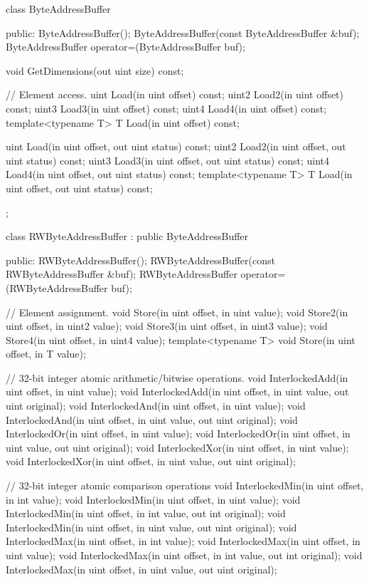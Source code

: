 \begin{HLSL}
 class ByteAddressBuffer {
 public:
   ByteAddressBuffer();
   ByteAddressBuffer(const ByteAddressBuffer &buf);
   ByteAddressBuffer operator=(ByteAddressBuffer buf);

   void GetDimensions(out uint size) const;

   // Element access.
   uint Load(in uint offset) const;
   uint2 Load2(in uint offset) const;
   uint3 Load3(in uint offset) const;
   uint4 Load4(in uint offset) const;
   template<typename T>
   T Load(in uint offset) const;

   uint Load(in uint offset, out uint status) const;
   uint2 Load2(in uint offset, out uint status) const;
   uint3 Load3(in uint offset, out uint status) const;
   uint4 Load4(in uint offset, out uint status) const;
   template<typename T>
   T Load(in uint offset, out uint status) const;
};

 class RWByteAddressBuffer : public ByteAddressBuffer {
 public:
   RWByteAddressBuffer();
   RWByteAddressBuffer(const RWByteAddressBuffer &buf);
   RWByteAddressBuffer operator=(RWByteAddressBuffer buf);

   // Element assignment.
   void Store(in uint offset, in uint value);
   void Store2(in uint offset, in uint2 value);
   void Store3(in uint offset, in uint3 value);
   void Store4(in uint offset, in uint4 value);
   template<typename T>
   void Store(in uint offset, in T value);

   // 32-bit integer atomic arithmetic/bitwise operations.
   void InterlockedAdd(in uint offset, in uint value);
   void InterlockedAdd(in uint offset, in uint value, out uint original);
   void InterlockedAnd(in uint offset, in uint value);
   void InterlockedAnd(in uint offset, in uint value, out uint original);
   void InterlockedOr(in uint offset, in uint value);
   void InterlockedOr(in uint offset, in uint value, out uint original);
   void InterlockedXor(in uint offset, in uint value);
   void InterlockedXor(in uint offset, in uint value, out uint original);

   // 32-bit integer atomic comparison operations
   void InterlockedMin(in uint offset, in int value);
   void InterlockedMin(in uint offset, in uint value);
   void InterlockedMin(in uint offset, in int value, out int original);
   void InterlockedMin(in uint offset, in uint value, out uint original);
   void InterlockedMax(in uint offset, in int value);
   void InterlockedMax(in uint offset, in uint value);
   void InterlockedMax(in uint offset, in int value, out int original);
   void InterlockedMax(in uint offset, in uint value, out uint original);

}
\end{HLSL}
